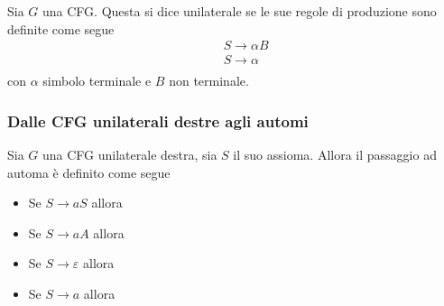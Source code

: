 \documentclass{subfiles}
\begin{document}
Sia \(G\) una CFG. Questa si dice unilaterale se le sue regole di produzione sono definite come segue
\[\begin{aligned}
         & \quad S \to \alpha B \\
         & \quad S \to \alpha   \\
    \end{aligned}\]
con \(\alpha\) simbolo terminale e \(B\) non terminale.

\subsubsection{Dalle CFG unilaterali destre agli automi}
Sia \(G\) una CFG unilaterale destra, sia \(S\) il suo assioma. Allora il passaggio ad automa è definito come segue
\begin{multicols}{2}
    \begin{itemize}
        \item Se \(S \to aS\) allora 
        \item Se \(S \to aA\) allora 
        \item Se \(S \to \varepsilon\) allora 
        \item Se \(S \to a\) allora 
    \end{itemize}
\end{multicols}
\end{document}

